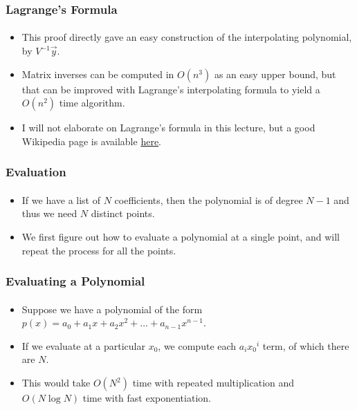 \documentclass{beamer}                             %
\begin{document}
\begin{frame}
\frametitle{Lagrange's Formula}
\framesubtitle{}
\begin{itemize}
  \item This proof directly gave an easy construction of
    the interpolating polynomial, by \( V^{-1} \vec{y} \).
  \item Matrix inverses can be computed in \( O(n^3) \) as an easy
    upper bound, but that can be improved with \alert{Lagrange's
    interpolating formula} to yield a \( O(n^2) \) time algorithm.
  \item I will not elaborate on Lagrange's formula in
    this lecture, but a good Wikipedia page is available
    \href{https://en.wikipedia.org/wiki/Lagrange\_polynomial}{here}.
\end{itemize}
\end{frame}

\begin{frame}
\frametitle{Evaluation}
\framesubtitle{}
\begin{itemize}
  \item If we have a list of \( N \) coefficients, then the polynomial
    is of degree \( N - 1 \) and thus we need \( N \) distinct points.
  \item We first figure out how to evaluate a polynomial at a
    single point, and will repeat the process for all the points.
\end{itemize}
\end{frame}

\begin{frame}
\frametitle{Evaluating a Polynomial}
\framesubtitle{}
\begin{itemize}
  \item Suppose we have a polynomial of the form
    \( p(x) = a_0 + a_1 x + a_2 x^2 + \dots + a_{n - 1} x^{n - 1} \).
  \item If we evaluate at a particular \( x_0 \), we compute
    each \( a_i {x_0}^i \) term, of which there are \( N \).
  \item This would take \( O(N^2) \) time with repeated multiplication
    and \( O(N \log N) \) time with fast exponentiation.
\end{itemize}
\end{frame}
\end{document}
